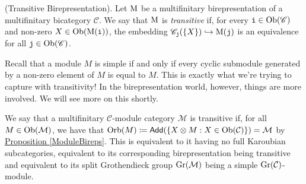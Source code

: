 \noindent\begin{definition}\textup{(Transitive Birepresentation).} Let $\textup{M}$ be a multifinitary birepresentation of a multifinitary bicategory $\mathscr{C}$. We say that $\textup{M}$ is {\em transitive} if, %
for every $\textnormal{\texttt{i}} \in \textnormal{Ob}(\mathscr{C})$ and non-zero $X \in \textnormal{Ob}(\textup{M}(\textnormal{\texttt{i}}))$, the embedding $\mathscr{C}_{\textnormal{\texttt{j}}}(\{X\}) \hookrightarrow \textup{M}(\textnormal{\texttt{j}})$ is an equivalence for all $\textnormal{\texttt{j}} \in \textnormal{Ob}(\mathscr{C})$.\\
\end{definition}
\newpage

\noindent\begin{remark} Recall that a module $M$ is simple if and only if every cyclic submodule generated by a non-zero element of $M$ is equal to $M$. This is exactly what we're trying to capture with transitivity! In the birepresentation world, however, things are more involved. We will see more on this shortly.\\%
\end{remark}

\noindent We say that a multifinitary $\mathcal{C}$-module category $\mathcal{M}$ is transitive if, for all $M \in \textnormal{Ob}(\mathcal{M})$, we have that $\textup{Orb}(M) \coloneqq \textsf{Add}(\{X \otimes M : X \in \textnormal{Ob}(\mathcal{C})\}) = \mathcal{M}$ by \hyperref[ModuleBireps]{Proposition \ref*{ModuleBireps}}. This is equivalent to it having no full Karoubian subcategories, equivalent to its corresponding birepresentation being transitive and equivalent to its split Grothendieck group $\textup{Gr}(\mathcal{M})$ being a simple $\textup{Gr}(\mathcal{C})$-module.\\


